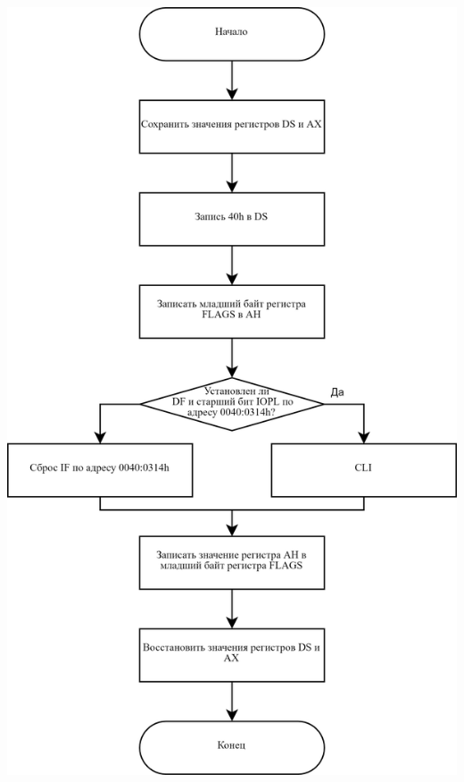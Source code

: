 \documentclass[a4paper,14pt]{article}
\begin{document}
\begin{center}
	\includegraphics[height=0.98\textheight]{img/int_8h-sub.png}
\end{center}
\end{document}

